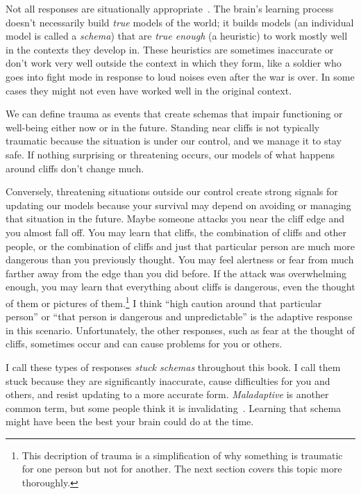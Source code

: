 \documentclass[11pt,oneside]{book}
\let\cite\parencite
\begin{document}
Not all responses are situationally appropriate~\cite{eckerUnlocking}. The brain's learning process doesn't necessarily build \textit{true} models of the world; it builds models (an individual model is called a \textit{schema}) that are \textit{true enough} (a heuristic) to work mostly well in the contexts they develop in. These heuristics are sometimes inaccurate or don't work very well outside the context in which they form, like a soldier who goes into fight mode in response to loud noises even after the war is over. In some cases they might not even have worked well in the original context.

We can define trauma as events that create schemas that impair functioning or well-being either now or in the future. Standing near cliffs is not typically traumatic because the situation is under our control, and we manage it to stay safe. If nothing surprising or threatening occurs, our models of what happens around cliffs don't change much.

Conversely, threatening situations outside our control create strong signals for updating our models because your survival may depend on avoiding or managing that situation in the future. Maybe someone attacks you near the cliff edge and you almost fall off. You may learn that cliffs, the combination of cliffs and other people, or the combination of cliffs and just that particular person are much more dangerous than you previously thought. You may feel alertness or fear from much farther away from the edge than you did before. If the attack was overwhelming enough, you may learn that everything about cliffs is dangerous, even the thought of them or pictures of them.\footnote{This decription of trauma is a simplification of why something is traumatic for one person but not for another. The next section covers this topic more thoroughly.} I think \enquote{high caution around that particular person} or \enquote{that person is dangerous and unpredictable} is the adaptive response in this scenario. Unfortunately, the other responses, such as fear at the thought of cliffs, sometimes occur and can cause problems for you or others.

I call these types of responses \textit{stuck schemas} throughout this book. I call them stuck because they are significantly inaccurate, cause difficulties for you and others, and resist updating to a more accurate form. \textit{Maladaptive} is another common term, but some people think it is invalidating~\cite{eckerUnlocking}. Learning that schema might have been the best your brain could do at the time.
\end{document}
